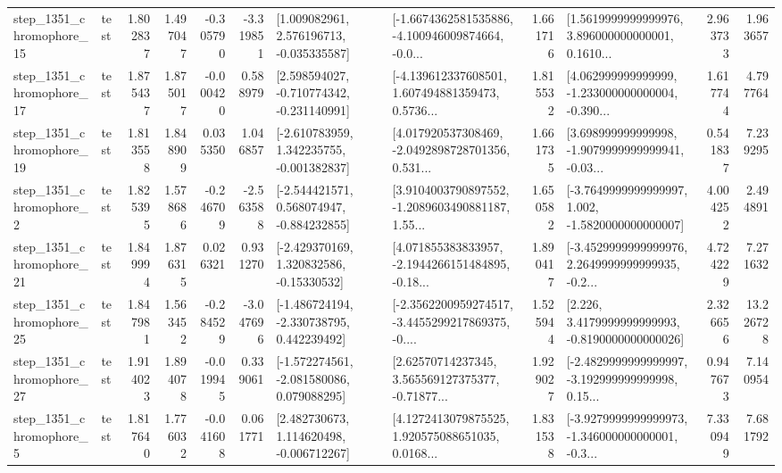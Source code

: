 \begin{tabular}{llrrrrllrlrr}
 step\_1351\_chromophore\_15 &      test &      1.802837 &    1.497047 &     -0.305790 & -3.319851 &    [1.009082961, 2.576196713, -0.035335587] &  [-1.6674362581535886, -4.100946009874664, -0.0... &       1.661716 &  [1.5619999999999976, 3.896000000000001, 0.1610... &            2.963733 &          1.963657 \\
 step\_1351\_chromophore\_17 &      test &      1.875437 &    1.875017 &     -0.000420 &  0.588979 &   [2.598594027, -0.710774342, -0.231140991] &  [-4.139612337608501, 1.607494881359473, 0.5736... &       1.815532 &  [4.062999999999999, -1.233000000000004, -0.390... &            1.617744 &          4.797764 \\
 step\_1351\_chromophore\_19 &      test &      1.813558 &    1.848909 &      0.035350 &  1.046857 &   [-2.610783959, 1.342235755, -0.001382837] &  [4.017920537308469, -2.0492898728701356, 0.531... &       1.661735 &  [3.698999999999998, -1.9079999999999941, -0.03... &            0.541837 &          7.239295 \\
  step\_1351\_chromophore\_2 &      test &      1.825395 &    1.578686 &     -0.246709 & -2.563588 &   [-2.544421571, 0.568074947, -0.884232855] &  [3.9104003790897552, -1.2089603490881187, 1.55... &       1.650582 &  [-3.7649999999999997, 1.002, -1.5820000000000007] &            4.004252 &          2.494891 \\
 step\_1351\_chromophore\_21 &      test &      1.849994 &    1.876315 &      0.026321 &  0.931270 &    [-2.429370169, 1.320832586, -0.15330532] &  [4.071855383833957, -2.1944266151484895, -0.18... &       1.890417 &  [-3.4529999999999976, 2.2649999999999935, -0.2... &            4.724229 &          7.271632 \\
 step\_1351\_chromophore\_25 &      test &      1.847981 &    1.563452 &     -0.284529 & -3.047696 &   [-1.486724194, -2.330738795, 0.442239492] &  [-2.3562200959274517, -3.4455299217869375, -0.... &       1.525944 &   [2.226, 3.4179999999999993, -0.8190000000000026] &            2.326656 &         13.226728 \\
 step\_1351\_chromophore\_27 &      test &      1.914023 &    1.894078 &     -0.019945 &  0.339061 &   [-1.572274561, -2.081580086, 0.079088295] &  [2.62570714237345, 3.565569127375377, -0.71877... &       1.929027 &  [-2.4829999999999997, -3.192999999999998, 0.15... &            0.947673 &          7.140954 \\
  step\_1351\_chromophore\_5 &      test &      1.817640 &    1.776032 &     -0.041608 &  0.061771 &    [2.482730673, 1.114620498, -0.006712267] &  [4.1272413079875525, 1.920575088651035, 0.0168... &       1.831538 &  [-3.9279999999999973, -1.346000000000001, -0.3... &            7.330949 &          7.681792 \\

\end{tabular}
